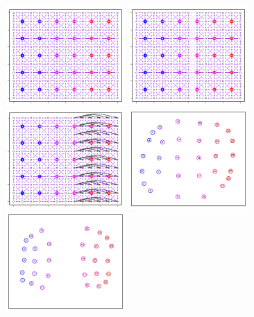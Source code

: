 \documentclass[12pt]{article}
\begin{document}
\begin{figure}
	\centering
			{\includegraphics[width=1.8in,height=1.5in]{figs/sims/basic_lattice.png}}
			{\includegraphics[width=1.8in,height=1.5in]{figs/sims/barrier_lattice.png}}
			{\includegraphics[width=1.8in,height=1.5in]{figs/sims/expansion_lattice.png}}
			{\includegraphics[width=1.8in,height=1.5in]{figs/sims/GeoGenMap_lattice.pdf}}
			{\includegraphics[width=1.8in,height=1.5in]{figs/sims/GeoGenMap_barrier.pdf}}

\end{figure}
\end{document}
